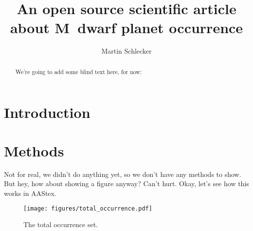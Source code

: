 \documentclass[twocolumn]{aastex631}
\begin{document}
\title{An open source scientific article about M~dwarf planet occurrence}

\author[0000-0001-8355-2107]{Martin Schlecker}


\begin{abstract}
    We're going to add some blind text here, for now:
    \blindtext
\end{abstract}

\section{Introduction}
\Blindtext[4]


\section{Methods}
   Not for real, we didn't do anything yet, so we don't have any methods to show.
    But hey, how about showing a figure anyway?
    Can't hurt. Okay, let's see how this works in AAStex.
\begin{figure}
    \begin{centering}
        \texttt{[image: figures/total\_occurrence.pdf]}
        \caption{The total occurrence set.}
        \label{fig:total_occurrence}
    \end{centering}
\end{figure}
\end{document}
